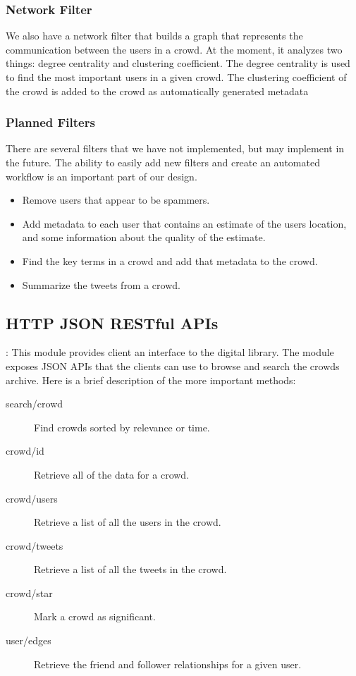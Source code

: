 \documentclass{sig-alternate}
\begin{document}
\subsubsection{Network Filter}
We also have a network filter that builds a graph that represents the
communication between the users in a crowd. At the moment, it analyzes two things:
degree centrality and clustering coefficient.  The degree centrality is used to
find the most important users in a given crowd. The clustering coefficient of
the crowd is added to the crowd as automatically generated metadata 

\subsubsection{Planned Filters}
There are several filters that we have not implemented, but may implement in
the future. The ability to easily add new filters and create an automated
workflow is an important part of our design.
\begin{itemize}
\item Remove users that appear to be spammers.
\item Add metadata to each user that contains an estimate of the users
    location, and some information about the quality of the estimate.
\item Find the key terms in a crowd and add that metadata to the crowd.
\item Summarize the tweets from a crowd.
\end{itemize}

\subsection{HTTP JSON RESTful APIs}: This module provides client an interface to the digital library. The module exposes JSON APIs that the clients can use to browse and search the crowds archive. Here is a brief description of the more important methods:
\begin{description}
 \item[search/crowd] Find crowds sorted by relevance or time.
 \item[crowd/id] Retrieve all of the data for a crowd.
 \item[crowd/users] Retrieve a list of all the users in the crowd.
 \item[crowd/tweets] Retrieve a list of all the tweets in the crowd.
 \item[crowd/star] Mark a crowd as significant.
 \item[user/edges] Retrieve the friend and follower relationships for a given user.
\end{description}
\end{document}
